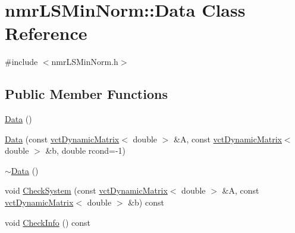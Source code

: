 \hypertarget{classnmr_l_s_min_norm_1_1_data}{\section{nmr\-L\-S\-Min\-Norm\-:\-:Data Class Reference}
\label{classnmr_l_s_min_norm_1_1_data}
}


{\ttfamily \#include $<$nmr\-L\-S\-Min\-Norm.\-h$>$}

\subsection*{Public Member Functions}
\begin{DoxyCompactItemize}
\item 
\hyperlink{classnmr_l_s_min_norm_1_1_data_aac14796a2e9ea67eabed1c3aeafb18dc}{Data} ()
\item 
\hyperlink{classnmr_l_s_min_norm_1_1_data_a75696f0eb43c94317631b82f5dd3d06e}{Data} (const \hyperlink{classvct_dynamic_matrix}{vct\-Dynamic\-Matrix}$<$ double $>$ \&A, const \hyperlink{classvct_dynamic_matrix}{vct\-Dynamic\-Matrix}$<$ double $>$ \&b, double rcond=-\/1)
\item 
\hyperlink{classnmr_l_s_min_norm_1_1_data_a7f1b52e36a8c52466bab96cff2d720b3}{$\sim$\-Data} ()
\item 
void \hyperlink{classnmr_l_s_min_norm_1_1_data_a0f04597193b0f510af26b4affc034119}{Check\-System} (const \hyperlink{classvct_dynamic_matrix}{vct\-Dynamic\-Matrix}$<$ double $>$ \&A, const \hyperlink{classvct_dynamic_matrix}{vct\-Dynamic\-Matrix}$<$ double $>$ \&b) const 
\item 
void \hyperlink{classnmr_l_s_min_norm_1_1_data_aa7c3d0742321eeec5f6e7d87f942b111}{Check\-Info} () const 
\end{DoxyCompactItemize}
